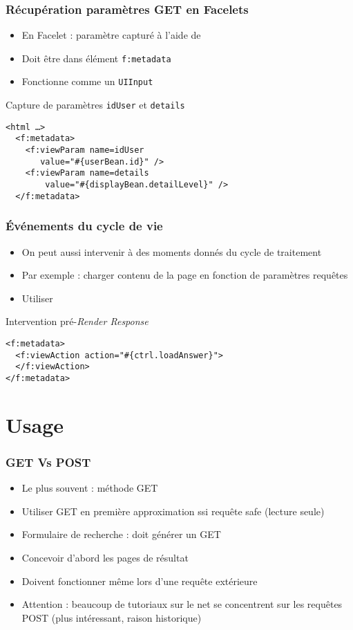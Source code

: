 \documentclass[english, french]{beamer}
\begin{document}
\begin{frame}[fragile]
	\frametitle{Récupération paramètres GET en Facelets}
	\begin{itemize}
		\item En Facelet : paramètre capturé à l’aide de 
		\item Doit être dans élément \texttt{f:metadata}
		\item Fonctionne comme un \texttt{UIInput}
	\end{itemize}
	\begin{exampleblock}{Capture de paramètres \texttt{idUser} et \texttt{details}}
		\begin{lstlisting}
<html …>
  <f:metadata>
    <f:viewParam name=idUser
       value="#{userBean.id}" />
    <f:viewParam name=details
        value="#{displayBean.detailLevel}" />
  </f:metadata>
		\end{lstlisting}
	\end{exampleblock}
\end{frame}

\begin{frame}[fragile]
	\frametitle{Événements du cycle de vie}
	\begin{itemize}
		\item On peut aussi intervenir à des moments donnés du cycle de traitement
		\item Par exemple : charger contenu de la page en fonction de paramètres requêtes
		\item Utiliser 
	\end{itemize}
	\begin{exampleblock}{Intervention pré-\emph{Render Response}}
		\begin{lstlisting}
<f:metadata>
  <f:viewAction action="#{ctrl.loadAnswer}">
  </f:viewAction>
</f:metadata>
		\end{lstlisting}
	\end{exampleblock}
\end{frame}

\section{Usage}
\begin{frame}
	\frametitle{GET Vs POST}
	\begin{itemize}
		\item Le plus souvent : méthode GET
		\item Utiliser GET {\tiny en première approximation} \alert{ssi requête \og{}safe\fg{}} {\tiny (lecture seule)}
		\item Formulaire de recherche : doit générer un GET
		\item Concevoir d’abord les pages de résultat
		\item Doivent fonctionner même lors d’une requête extérieure
		\item Attention : beaucoup de tutoriaux sur le net se concentrent sur les requêtes POST {\tiny (plus intéressant, raison historique)}
	\end{itemize}
\end{frame}
\end{document}
